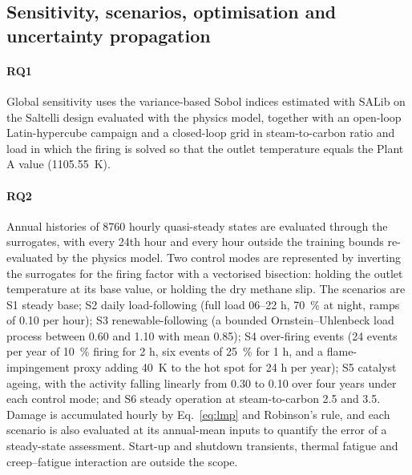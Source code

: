 \subsection{Sensitivity, scenarios, optimisation and uncertainty propagation}
\label{sec:campaigns}

\paragraph{RQ1} Global sensitivity uses the variance-based Sobol indices \cite{saltelli2010} estimated with SALib
\cite{herman2017} on the Saltelli design evaluated with the physics model, together with an open-loop Latin-hypercube campaign and a
closed-loop grid in steam-to-carbon ratio and load in which the firing is solved so that the outlet temperature equals the Plant A
value (\SI{1105.55}{K}).

\paragraph{RQ2} Annual histories of 8760 hourly quasi-steady states are evaluated through the surrogates, with every 24th hour and
every hour outside the training bounds re-evaluated by the physics model. Two control modes are represented by inverting the
surrogates for the firing factor with a vectorised bisection: holding the outlet temperature at its base value, or holding the dry
methane slip. The scenarios are S1 steady base; S2 daily load-following (full load 06--22 h, \SI{70}{\percent} at night, ramps of
0.10 per hour); S3 renewable-following (a bounded Ornstein--Uhlenbeck load process between 0.60 and 1.10 with mean 0.85); S4
over-firing events (24 events per year of \SI{+10}{\percent} firing for 2 h, six events of \SI{+25}{\percent} for 1 h, and a
flame-impingement proxy adding \SI{40}{K} to the hot spot for 24 h per year); S5 catalyst ageing, with the activity falling
linearly from 0.30 to 0.10 over four years under each control mode; and S6 steady operation at steam-to-carbon 2.5 and 3.5. Damage
is accumulated hourly by Eq.~\eqref{eq:lmp} and Robinson's rule, and each scenario is also evaluated at its annual-mean inputs to
quantify the error of a steady-state assessment. Start-up and shutdown transients, thermal fatigue and creep--fatigue interaction are
outside the scope.

